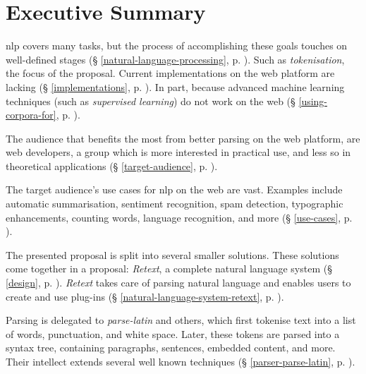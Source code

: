 
\begingroup
\let\clearpage\relax
\let\cleardoublepage\relax
\let\cleardoublepage\relax

\chapter*{Executive Summary}

\gls{nlp} covers many tasks, but the process of accomplishing
  these goals touches on well-defined stages
  (§ \ref{natural-language-processing},
  p. \pageref{natural-language-processing}).
Such as \emph{tokenisation}, the focus of the proposal.
Current implementations on the web platform are lacking
  (§ \ref{implementations}, p. \pageref{implementations}).
In part, because advanced machine learning techniques (such as
  \emph{supervised learning}) do not work on the web
  (§ \ref{using-corpora-for}, p. \pageref{using-corpora-for}).

The audience that benefits the most from better parsing on the web platform,
  are web developers, a group which is more interested in practical use, and
  less so in theoretical applications
  (§ \ref{target-audience}, p. \pageref{target-audience}).

The target audience's use cases for \gls{nlp} on the web are vast. Examples
  include automatic summarisation, sentiment recognition, spam detection,
  typographic enhancements, counting words, language recognition, and more
  (§ \ref{use-cases}, p. \pageref{use-cases}).

The presented proposal is split into several smaller solutions.
These solutions come together in a proposal: \emph{Retext}, a complete
  natural language system (§ \ref{design}, p. \pageref{design}).
\emph{Retext} takes care of parsing natural language and enables users to
  create and use plug-ins (§ \ref{natural-language-system-retext},
  p. \pageref{natural-language-system-retext}).

Parsing is delegated to \emph{parse-latin} and others, which first tokenise
  text into a list of words, punctuation, and white space. Later, these
  tokens are parsed into a syntax tree, containing paragraphs, sentences,
  embedded content, and more. Their intellect extends several well known
  techniques (§ \ref{parser-parse-latin}, p. \pageref{parser-parse-latin}).

